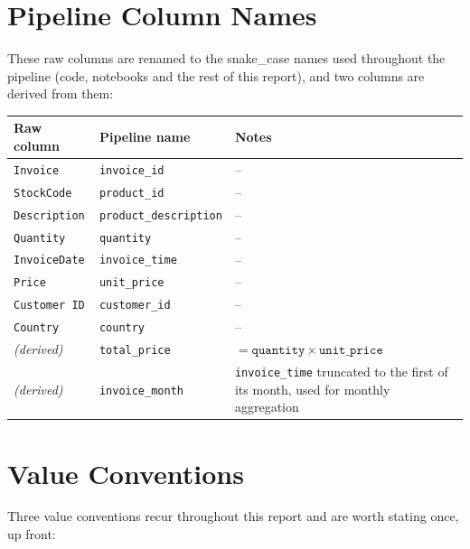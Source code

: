 \section{Pipeline Column Names}
\label{sec:3-4}

These raw columns are renamed to the snake\_case names used throughout the pipeline (code, notebooks and the rest of this report), and two columns are derived from them:

\begin{center}
\begin{tabular}{@{}p{3cm}p{4cm}p{7.6cm}@{}}
    \toprule
    Raw column & Pipeline name & Notes \\
    \midrule
    \texttt{Invoice} & \texttt{invoice\_id} & -- \\
    \texttt{StockCode} & \texttt{product\_id} & -- \\
    \texttt{Description} & \texttt{product\_description} & -- \\
    \texttt{Quantity} & \texttt{quantity} & -- \\
    \texttt{InvoiceDate} & \texttt{invoice\_time} & -- \\
    \texttt{Price} & \texttt{unit\_price} & -- \\
    \texttt{Customer ID} & \texttt{customer\_id} & -- \\
    \texttt{Country} & \texttt{country} & -- \\
    \emph{(derived)} & \texttt{total\_price} & $= \texttt{quantity} \times \texttt{unit\_price}$ \\
    \emph{(derived)} & \texttt{invoice\_month} & \texttt{invoice\_time} truncated to the first of its month, used for monthly aggregation \\
    \bottomrule
\end{tabular}
\end{center}

\section{Value Conventions}
\label{sec:3-5}

Three value conventions recur throughout this report and are worth stating once, up front:

